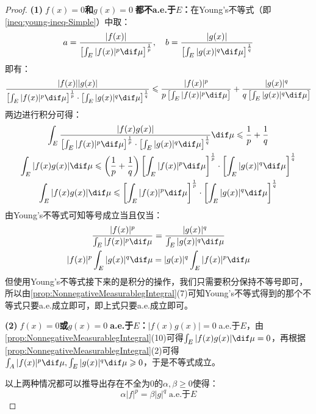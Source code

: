 \begin{proof}
	\textbf{(1)$\;f(x)=0$和$g(x)=0\;$都不a.e.于$E$：}在Young's不等式（即\cref{ineq:young-ineq-Simple}）中取：
	\begin{equation*}
		a=\frac{|f(x)|}{\left[\int_{E}^{}|f(x)|^p\dif\mu\right]^\frac{1}{p}},\quad
		b=\frac{|g(x)|}{\left[\int_{E}^{}|g(x)|^q\dif\mu\right]^\frac{1}{q}}
	\end{equation*}
	即有：
	\begin{equation*}
		\frac{|f(x)||g(x)|}{\left[\int_{E}^{}|f(x)|^p\dif\mu\right]^\frac{1}{p}\cdot\left[\int_{E}^{}|g(x)|^q\dif\mu\right]^\frac{1}{q}}
		\leqslant\frac{|f(x)|^p}{p\left[\int_{E}^{}|f(x)|^p\dif\mu\right]}+\frac{|g(x)|^q}{q\left[\int_{E}^{}|g(x)|^q\dif\mu\right]}
	\end{equation*}
	两边进行积分可得：
	\begin{gather*}
		\int_{E}\frac{|f(x)g(x)|}{\left[\int_{E}^{}|f(x)|^p\dif\mu\right]^\frac{1}{p}\cdot\left[\int_{E}^{}|g(x)|^q\dif\mu\right]^\frac{1}{q}}\dif\mu\leqslant\frac{1}{p}+\frac{1}{q} \\
		\int_{E}|f(x)g(x)|\dif\mu\leqslant\left(\frac{1}{p}+\frac{1}{q}\right)\left[\int_{E}^{}|f(x)|^p\dif\mu\right]^\frac{1}{p}\cdot\left[\int_{E}^{}|g(x)|^q\dif\mu\right]^\frac{1}{q} \\
		\int_{E}|f(x)g(x)|\dif\mu\leqslant\left[\int_{E}^{}|f(x)|^p\dif\mu\right]^\frac{1}{p}\cdot\left[\int_{E}^{}|g(x)|^q\dif\mu\right]^\frac{1}{q}
	\end{gather*}
	由Young's不等式可知等号成立当且仅当：
	\begin{gather*}
		\frac{|f(x)|^p}{\int_{E}^{}|f(x)|^p\dif\mu}=\frac{|g(x)|^q}{\int_{E}^{}|g(x)|^q\dif\mu} \\
		|f(x)|^p\int_{E}^{}|g(x)|^q\dif\mu=|g(x)|^q\int_{E}^{}|f(x)|^p\dif\mu
	\end{gather*}
	但使用Young's不等式接下来的是积分的操作，我们只需要积分保持不等号即可，所以由\cref{prop:NonnegativeMeasurablegIntegral}(7)可知Young's不等式得到的那个不等式只要a.e.成立即可，即上式只要a.e.成立即可。\par
	\textbf{(2)$\;f(x)=0$或$g(x)=0\;$a.e.于$E$：}$|f(x)g(x)|=0\;$a.e.于$E$，由\cref{prop:NonnegativeMeasurablegIntegral}(10)可得$\int_{E}|f(x)g(x)|\dif\mu=0$，再根据\cref{prop:NonnegativeMeasurablegIntegral}(2)可得$\int_{A}|f(x)|^p\dif\mu,\int_{E}|g(x)|^q\dif\mu\geqslant0$，于是不等式成立。\par
	以上两种情况都可以推导出存在不全为$0$的$\alpha,\beta\geqslant0$使得：
	\begin{equation*}
		\alpha|f|^p=\beta|g|^q\;\text{a.e.于$E$}

\end{equation*}
\end{proof}
